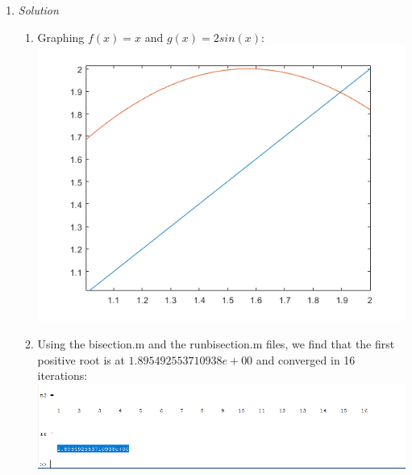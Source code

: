 \documentclass[12pt,letterpaper]{article}
\begin{document}
\begin{enumerate}
    \item \emph{Solution}\\
    \begin{enumerate}
        \item Graphing $f(x) = x$ and $g(x) = 2sin(x)$: \\
        \includegraphics{number1a.png}\\
        \item 
        Using the bisection.m and the runbisection.m files, we find that the first 
        positive root is at $1.895492553710938e+00$ and converged in 16 iterations: \\
        \includegraphics[scale = .7]{number1b.png}\\
    \end{enumerate}


\end{enumerate}
\end{document}
